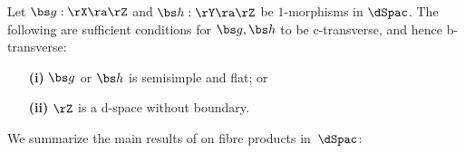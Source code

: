 \documentclass{article}
\begin{document}
\begin{lem} Let\/ $\bs g:\rX\ra\rZ$ and\/ $\bs h:\rY\ra\rZ$ be\/
$1$-morphisms in $\dSpac$. The following are sufficient conditions
for\/ $\bs g,\bs h$ to be c-transverse, and hence b-transverse:
\begin{itemize}
\setlength{\itemsep}{0pt}
\setlength{\parsep}{0pt}
\item[{\bf(i)}] $\bs g$ or $\bs h$ is semisimple and flat;
or
\item[{\bf(ii)}] $\rZ$ is a d-space without boundary.
\end{itemize}
\label{ds6lem}
\end{lem}

We summarize the main results of \cite[\S 6.8]{Joyc6} on fibre
products in~$\dSpac$:
\end{document}
